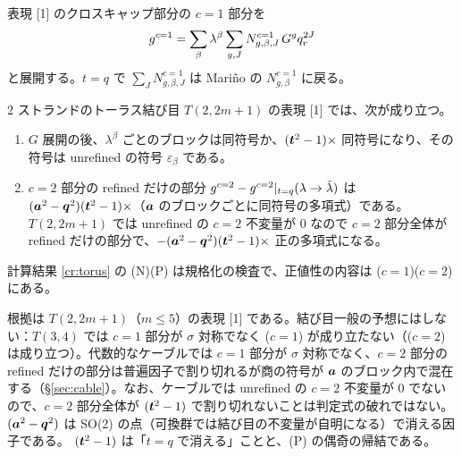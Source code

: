 \begin{definition}\label{def:c1}
表現 [1] のクロスキャップ部分の $c = 1$ 部分を
\[
g^{c=1} = \sum_\beta \lambda^\beta \sum_{g, J} N^{c=1}_{g,\beta,J}\, G^g q_r^{2J}
\]
と展開する。$t = q$ で $\sum_J N^{c=1}_{g,\beta,J}$ は Mariño の $N^{c=1}_{g,\beta}$ に戻る。
\end{definition}

\begin{conjecture}[判定式]\label{conj:criterion}
2 ストランドのトーラス結び目 $T(2,2m+1)$ の表現 [1] では、次が成り立つ。
\begin{enumerate}
\item[($c{=}1$)] $G$ 展開の後、$\lambda^\beta$ ごとのブロックは同符号か、$(\bm{t}^2 - 1)\times$ 同符号になり、その符号は unrefined の符号 $\varepsilon_\beta$ である。
\item[($c{=}2$)] $c = 2$ 部分の refined だけの部分 $g^{c=2} - g^{c=2}|_{t=q}(\lambda \to \tilde\lambda)$ は $(\bm{a}^2 - \bm{q}^2)(\bm{t}^2 - 1)\times$（$\bm{a}$ のブロックごとに同符号の多項式）である。$T(2,2m+1)$ では unrefined の $c = 2$ 不変量が 0 なので $c = 2$ 部分全体が refined だけの部分で、$-(\bm{a}^2 - \bm{q}^2)(\bm{t}^2 - 1)\times$ 正の多項式になる。
\end{enumerate}
計算結果 \ref{cr:torus} の (N)(P) は規格化の検査で、正値性の内容は ($c{=}1$)($c{=}2$) にある。
\end{conjecture}
根拠は $T(2,2m+1)$（$m \le 5$）の表現 [1] である。結び目一般の予想にはしない：$T(3,4)$ では $c = 1$ 部分が $\sigma$ 対称でなく ($c{=}1$) が成り立たない（($c{=}2$) は成り立つ）。代数的なケーブルでは $c = 1$ 部分が $\sigma$ 対称でなく、$c = 2$ 部分の refined だけの部分は普遍因子で割り切れるが商の符号が $\bm{a}$ のブロック内で混在する（§\ref{sec:cable}）。なお、ケーブルでは unrefined の $c = 2$ 不変量が 0 でないので、$c = 2$ 部分全体が $(\bm{t}^2 - 1)$ で割り切れないことは判定式の破れではない。
$(\bm{a}^2 - \bm{q}^2)$ は SO(2) の点（可換群では結び目の不変量が自明になる）で消える因子である。
$(\bm{t}^2 - 1)$ は「$t = q$ で消える」ことと、(P) の偶奇の帰結である。
